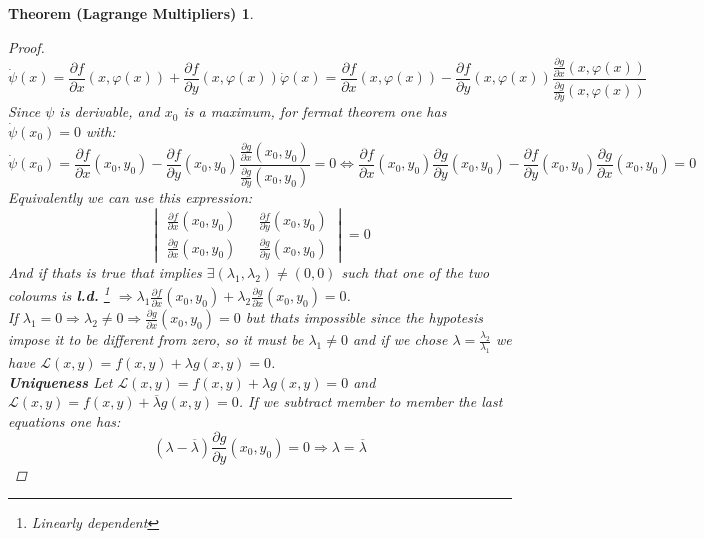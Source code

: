 \documentclass{article}
\newtheorem*{lagrangemult}{Theorem (Lagrange Multipliers)}
\begin{document}
\begin{lagrangemult}
\begin{proof}
                \begin{equation*}
                    \dot{\psi}(x) = \frac{\partial f}{\partial x}(x,\varphi (x)) + \frac{\partial f}{\partial y}(x,\varphi (x)) \dot{\varphi} (x) = \frac{\partial f}{\partial x}(x,\varphi (x)) - \frac{\partial f}{\partial y}(x,\varphi (x)) \frac{\frac{\partial g}{\partial x}(x,\varphi (x))}{\frac{\partial g}{\partial y}(x,\varphi (x))}
                \end{equation*}
                Since $\psi$ is derivable, and $x_0$ is a maximum, for fermat theorem one has $\dot{\psi}(x_0)=0$ with: 
                \begin{equation*}
                    \dot{\psi}(x_0) = \frac{\partial f}{\partial x}(x_0,y_0) - \frac{\partial f}{\partial y}(x_0,y_0) \frac{\frac{\partial g}{\partial x}(x_0,y_0)}{\frac{\partial g}{\partial y}(x_0,y_0)} = 0 \Longleftrightarrow  \frac{\partial f}{\partial x}(x_0,y_0)\frac{\partial g}{\partial y}(x_0,y_0) - \frac{\partial f}{\partial y}(x_0,y_0)\frac{\partial g}{\partial x}(x_0,y_0) = 0
                \end{equation*}
                Equivalently we can use this expression:
                \begin{equation*}
                    \begin{vmatrix}
                        \frac{\partial f}{\partial x}(x_0,y_0) && \frac{\partial f}{\partial y}(x_0,y_0) \\
                        \frac{\partial g}{\partial x}(x_0,y_0) && \frac{\partial g}{\partial y}(x_0,y_0)
                    \end{vmatrix} = 0
                \end{equation*}
                And if thats is true that implies $\exists (\lambda_1, \lambda_2) \neq (0,0)$ such that one of the two coloums is \textbf{l.d.} \footnote{Linearly dependent} $\Longrightarrow \lambda_1\frac{\partial f}{\partial x}(x_0,y_0) + \lambda_2\frac{\partial g}{\partial x}(x_0,y_0) = 0$. \\
                If $\lambda_1 = 0 \Rightarrow \lambda_2 \neq 0 \Rightarrow \frac{\partial g}{\partial x}(x_0,y_0) = 0$ but thats impossible since the hypotesis impose it to be different from zero, so it must be $\lambda_1 \neq 0$ and if we chose $\lambda = \frac{\lambda_2}{\lambda_1}$ we have $\mathcal{L} (x,y) = f(x,y) + \lambda g(x,y) = 0$. \\
                \textbf{Uniqueness} Let $\mathcal{L} (x,y) = f(x,y) + \lambda g(x,y) = 0$ and $\mathcal{L} (x,y) = f(x,y) + \overline{\lambda}  g(x,y) = 0$. If we subtract member to member the last equations one has: 
                \begin{equation*}
                    \left( \lambda - \overline{\lambda} \right) \frac{\partial g}{\partial y}(x_0,y_0) = 0 \Rightarrow  \lambda = \overline{\lambda}
                \end{equation*}
            \end{proof} 
        \end{lagrangemult}
\end{document}
